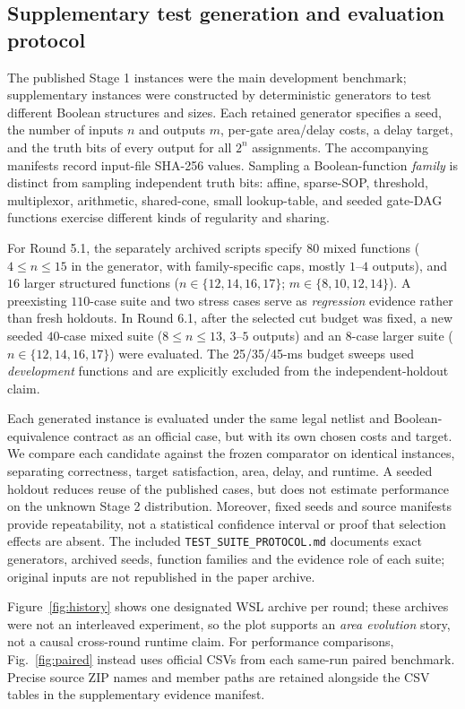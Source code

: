 \documentclass[journal,10pt]{IEEEtran}
\begin{document}
\subsection{Supplementary test generation and evaluation protocol}
The published Stage 1 instances were the main development benchmark; supplementary instances were constructed by deterministic generators to test different Boolean structures and sizes. Each retained generator specifies a seed, the number of inputs $n$ and outputs $m$, per-gate area/delay costs, a delay target, and the truth bits of every output for all $2^n$ assignments. The accompanying manifests record input-file SHA-256 values. Sampling a Boolean-function \emph{family} is distinct from sampling independent truth bits: affine, sparse-SOP, threshold, multiplexor, arithmetic, shared-cone, small lookup-table, and seeded gate-DAG functions exercise different kinds of regularity and sharing.

For Round 5.1, the separately archived scripts specify $80$ mixed functions ($4\leq n\leq15$ in the generator, with family-specific caps, mostly $1$--$4$ outputs), and $16$ larger structured functions ($n\in\{12,14,16,17\}$; $m\in\{8,10,12,14\}$). A preexisting $110$-case suite and two stress cases serve as \emph{regression} evidence rather than fresh holdouts. In Round 6.1, after the selected cut budget was fixed, a new seeded $40$-case mixed suite ($8\leq n\leq13$, $3$--$5$ outputs) and an $8$-case larger suite ($n\in\{12,14,16,17\}$) were evaluated. The 25/35/45-ms budget sweeps used \emph{development} functions and are explicitly excluded from the independent-holdout claim.

Each generated instance is evaluated under the same legal netlist and Boolean-equivalence contract as an official case, but with its own chosen costs and target. We compare each candidate against the frozen comparator on identical instances, separating correctness, target satisfaction, area, delay, and runtime. A seeded holdout reduces reuse of the published cases, but does not estimate performance on the unknown Stage 2 distribution. Moreover, fixed seeds and source manifests provide repeatability, not a statistical confidence interval or proof that selection effects are absent. The included \texttt{TEST\_SUITE\_PROTOCOL.md} documents exact generators, archived seeds, function families and the evidence role of each suite; original inputs are not republished in the paper archive.


Figure~\ref{fig:history} shows one designated WSL archive per round; these archives were not an interleaved experiment, so the plot supports an \emph{area evolution} story, not a causal cross-round runtime claim. For performance comparisons, Fig.~\ref{fig:paired} instead uses official CSVs from each same-run paired benchmark. Precise source ZIP names and member paths are retained alongside the CSV tables in the supplementary evidence manifest.
\end{document}
